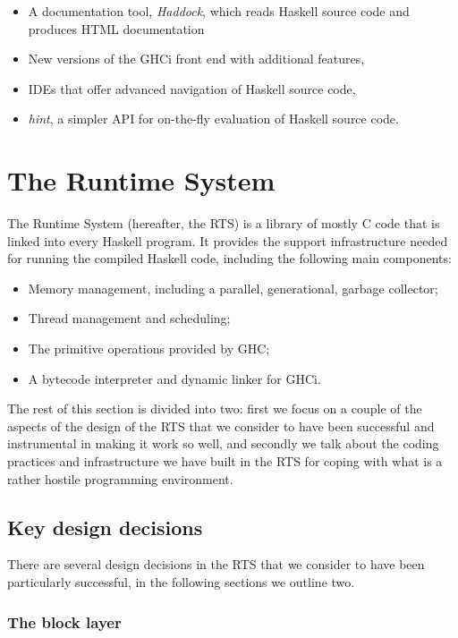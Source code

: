 \documentclass{article}
\begin{document}
\begin{itemize}
\item A documentation tool, \emph{Haddock}, which reads Haskell source
  code and produces HTML documentation
\item New versions of the GHCi front end with additional features,
\item IDEs that offer advanced navigation of Haskell source code,
\item \emph{hint}, a simpler API for on-the-fly evaluation of Haskell
  source code.
\end{itemize}

\section{The Runtime System}
\label{s:rts}

The Runtime System (hereafter, the RTS) is a library of mostly C code
that is linked into every Haskell program.  It provides the support
infrastructure needed for running the compiled Haskell code, including
the following main components:

\begin{itemize}
\item Memory management, including a parallel, generational, garbage collector;
\item Thread management and scheduling;
\item The primitive operations provided by GHC;
\item A bytecode interpreter and dynamic linker for GHCi.
\end{itemize}

The rest of this section is divided into two: first we focus on a
couple of the aspects of the design of the RTS that we consider to
have been successful and instrumental in making it work so well, and
secondly we talk about the coding practices and infrastructure we have
built in the RTS for coping with what is a rather hostile programming
environment.

\subsection{Key design decisions}

There are several design decisions in the RTS that we consider to have
been particularly successful, in the following sections we outline
two.

\subsubsection{The block layer}
\end{document}
